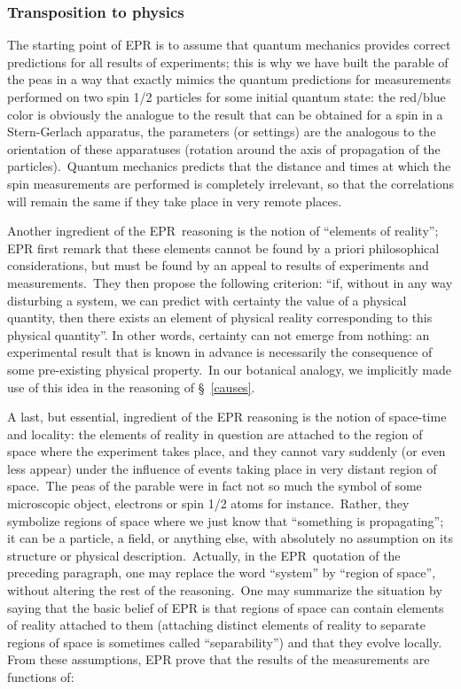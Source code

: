 \documentclass[12pt,onecolumn]{article}%
\begin{document}
\subsubsection{Transposition to physics}

\label{transpo}

The starting point of EPR is to assume that quantum mechanics provides correct
predictions for all results of experiments; this is why we have built the
parable of the peas in a way that exactly mimics the quantum predictions for
measurements performed on two spin 1/2 particles for some initial quantum
state: the red/blue color is obviously the analogue to the result that can be
obtained for a spin in a Stern-Gerlach apparatus, the parameters (or settings)
are the analogous to the orientation of these apparatuses (rotation around the
axis of propagation of the particles).\ Quantum mechanics predicts that the
distance and times at which the spin measurements are performed is completely
irrelevant, so that the correlations will remain the same if they take place
in very remote places.

Another ingredient of the EPR\ reasoning is the notion of ``elements of
reality''; EPR first remark that these elements cannot be found by a priori
philosophical considerations, but must be found by an appeal to results of
experiments and measurements.\ They then propose the following criterion:
``if, without in any way disturbing a system, we can predict with certainty
the value of a physical quantity, then there exists an element of physical
reality corresponding to this physical quantity''. In other words, certainty
can not emerge from nothing: an experimental result that is known in advance
is necessarily the consequence of some pre-existing physical property.\ In our
botanical analogy, we implicitly made use of this idea in the reasoning of
\S \ \ref{causes}.

A last, but essential, ingredient of the EPR reasoning is the notion of
space-time and locality: the elements of reality in question are attached to
the region of space where the experiment takes place, and they cannot vary
suddenly (or even less appear) under the influence of events taking place in
very distant region of space.\ The peas of the parable were in fact not so
much the symbol of some microscopic object, electrons or spin 1/2 atoms for
instance.\ Rather, they symbolize regions of space where we just know that
``something is propagating''; it can be a particle, a field, or anything else,
with absolutely no assumption on its structure or physical
description.\ Actually, in the EPR\ quotation of the preceding paragraph, one
may replace the word ``system'' by ``region of space'', without altering the
rest of the reasoning.\ One may summarize the situation by saying that the
basic belief of EPR is that regions of space can contain elements of reality
attached to them (attaching distinct elements of reality to separate regions
of space is sometimes called ``separability'') and that they evolve locally.
From these assumptions, EPR prove that the results of the measurements are
functions of:
\end{document}
